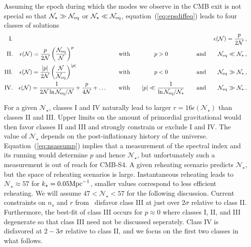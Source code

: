 Assuming the epoch during which the modes we observe in the CMB exit is not special so that $\mathcal{N}_\star\gg\mathcal{N}_{\rm eq}$ or $\mathcal{N}_\star\ll\mathcal{N}_{\rm eq}$, equation~(\ref{eq:epsdiffeq}) leads to four classes of solutions
\begin{eqnarray}
{\rm I.}&&\epsilon(\mathcal{N})=\frac{p}{2\mathcal{N}}\,,\\
{\rm II.}&&\epsilon(\mathcal{N})=\frac{p}{2\mathcal{N}}\left(\frac{\mathcal{N}_{\rm eq}}{\mathcal{N}}\right)^p\hspace{1.92cm}\qquad{\rm with}\qquad \hspace{7.3mm}p>0 \hspace{1.0cm}\qquad{\rm and}\qquad\mathcal{N}_{\rm eq}\ll\mathcal{N}_\star\,,\label{eq:classII}\\
{\rm III.}&&\epsilon(\mathcal{N})=\frac{|p|}{2\mathcal{N}}\left(\frac{\mathcal{N}}{\mathcal{N}_{\rm eq}}\right)^{|p|}\hspace{1.77cm}\qquad{\rm with}\qquad \hspace{7.3mm}p<0 \hspace{1.0cm}\qquad{\rm and}\qquad\mathcal{N}_{\rm eq}\gg\mathcal{N}_\star\,,\\
{\rm IV.}&&\epsilon(\mathcal{N})=\frac{1}{2\mathcal{N}\ln\mathcal{N}_{\rm eq}/\mathcal{N}}+\frac{p}{4\mathcal{N}}+\dots\qquad{\rm with}\qquad |p|\ll\frac{1}{\ln\mathcal{N}_{\rm eq}/\mathcal{N}_\star}\qquad{\rm and}\qquad \mathcal{N}_{\rm eq}\gg\mathcal{N}_\star\,.
\end{eqnarray}

For a given $\mathcal{N}_\star$, classes I and IV naturally lead to larger $r= 16\epsilon(\mathcal{N}_\star)$ than classes II and III. Upper limits on the amount of primordial gravitational would then favor classes II and III and strongly constrain or exclude I and IV. The value of $\mathcal{N}_\star$ depends on the post-inflationary history of the universe. Equation~(\ref{eq:nsassump}) implies that a measurement of the spectral index and its running would determine $p$ and hence $\mathcal{N}_\star$, but unfortunately such a measurement is out of reach for CMB-S4. A given reheating scenario predicts $\mathcal{N}_\star$, but the space of reheating scenarios is large. Instantaneous reheating leads to $\mathcal{N}_\star\approx 57$ for $k_\star=0.05 {\rm Mpc}^{-1}$, smaller values correspond to less efficient reheating. We will assume $47<\mathcal{N}_\star<57$ for the following discussion. Current constraints on $n_s$ and $r$ from~\cite{bicepkeckplanck15} disfavor class III at just over $2\sigma$ relative to class II. Furthermore, the best-fit of class III occurs for $p\approx 0$ where classes I, II, and III degenerate so that class III need not be discussed seperately. Class IV is disfavored at $2-3\sigma$ relative to class II, and we focus on the first two classes in what follows.

